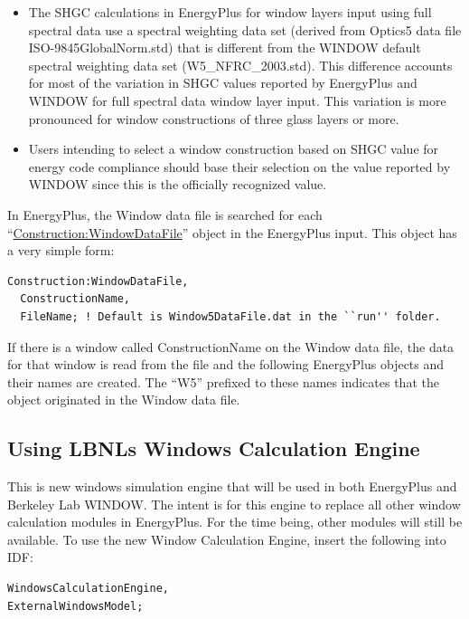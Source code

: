 \begin{itemize}
\item
  The SHGC calculations in EnergyPlus for window layers input using full spectral data use a spectral weighting data set (derived from Optics5 data file ISO-9845GlobalNorm.std) that is different from the WINDOW default spectral weighting data set (W5\_NFRC\_2003.std). This difference accounts for most of the variation in SHGC values reported by EnergyPlus and WINDOW for full spectral data window layer input. This variation is more pronounced for window constructions of three glass layers or more.
\item
  Users intending to select a window construction based on SHGC value for energy code compliance should base their selection on the value reported by WINDOW since this is the officially recognized value.
\end{itemize}

In EnergyPlus, the Window data file is searched for each ``\hyperref[constructionwindowdatafile]{Construction:WindowDataFile}'' object in the EnergyPlus input. This object has a very simple form:

\begin{lstlisting}
Construction:WindowDataFile,
  ConstructionName,
  FileName; ! Default is Window5DataFile.dat in the ``run'' folder.
\end{lstlisting}

If there is a window called ConstructionName on the Window data file, the data for that window is read from the file and the following EnergyPlus objects and their names are created. The ``W5'' prefixed to these names indicates that the object originated in the Window data file.

\subsection{Using LBNLs Windows Calculation Engine}\label{windowscalculationengine}
This is new windows simulation engine that will be used in both EnergyPlus and Berkeley Lab WINDOW. The intent is for this engine to replace all other window calculation modules in EnergyPlus. For the time being, other modules will still be available. To use the new Window Calculation Engine, insert the following into IDF:

\begin{lstlisting}
WindowsCalculationEngine,
ExternalWindowsModel;
\end{lstlisting}
